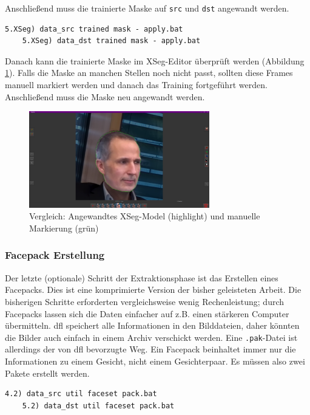 Anschließend muss die trainierte Maske auf \texttt{src} und \texttt{dst} angewandt werden.
\begin{lstlisting}[numbers=none,label={lst:xseg-apply}]
    5.XSeg) data_src trained mask - apply.bat
    5.XSeg) data_dst trained mask - apply.bat
\end{lstlisting}
Danach kann die trainierte Maske im XSeg-Editor überprüft werden (Abbildung \ref{fig:xseg-train-comparison}).
Falls die Maske an manchen Stellen noch nicht passt, sollten diese Frames manuell markiert werden und danach das Training fortgeführt werden.
Anschließend muss die Maske neu angewandt werden.

\begin{figure}
    \center
    \includegraphics[width=0.7\textwidth]{Bilder/DFL/XSegEditor-6-trained-draw-comparision}
    \caption{Vergleich: Angewandtes XSeg-Model (highlight) und manuelle Markierung (grün)}
    \label{fig:xseg-train-comparison}
\end{figure}

\subsubsection*{Facepack Erstellung}
Der letzte (optionale) Schritt der Extraktionsphase ist das Erstellen eines Facepacks.
Dies ist eine komprimierte Version der bisher geleisteten Arbeit.
Die bisherigen Schritte erforderten vergleichsweise wenig Rechenleistung; durch Facepacks lassen sich die Daten einfacher auf z.B. einen stärkeren Computer übermitteln.
\gls{dfl} speichert alle Informationen in den Bilddateien, daher könnten die Bilder auch einfach in einem Archiv verschickt werden.
Eine \texttt{.pak}-Datei ist allerdings der von \gls{dfl} bevorzugte Weg.
Ein Facepack beinhaltet immer nur die Informationen zu einem Gesicht, nicht einem Gesichterpaar.
Es müssen also zwei Pakete erstellt werden.
\begin{lstlisting}[numbers=none,label={lst:facepack}]
    4.2) data_src util faceset pack.bat
    5.2) data_dst util faceset pack.bat
\end{lstlisting}
